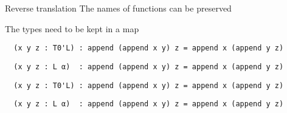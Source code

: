 \begin{frame}{Reverse translation} %
  The names of functions can be preserved

  The types need to be kept in a map

  \pagebreak

  \begin{verbatim}
  (x y z : T0'L) : append (append x y) z = append x (append y z)
  \end{verbatim}
  \fade
  \begin{verbatim}
  (x y z : L α)  : append (append x y) z = append x (append y z)
  \end{verbatim}

  \pagebreak

  \fade
  \begin{verbatim}
  (x y z : T0'L) : append (append x y) z = append x (append y z)
  \end{verbatim}
  \unfade
  \begin{verbatim}
  (x y z : L α)  : append (append x y) z = append x (append y z)
  \end{verbatim}

\end{frame}
